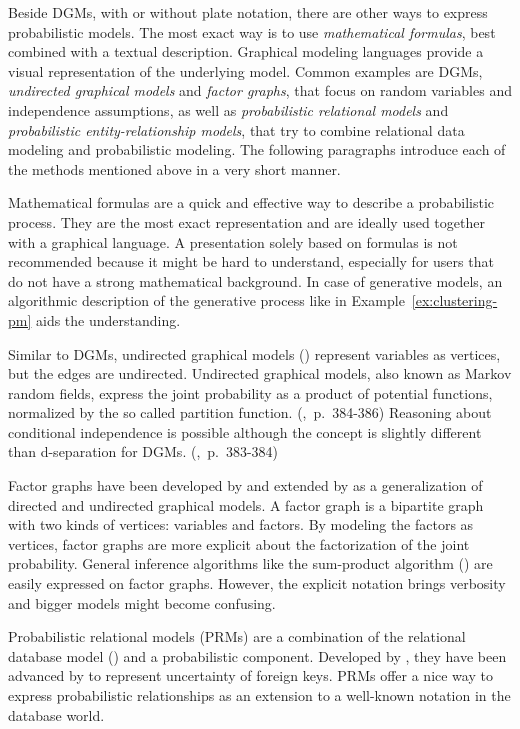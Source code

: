 Beside DGMs, with or without plate notation, there are other ways to express probabilistic models. The most exact way is to use \emph{mathematical formulas}, best combined with a textual description. Graphical modeling languages provide a visual representation of the underlying model. Common examples are DGMs, \emph{undirected graphical models} and \emph{factor graphs}, that focus on random variables and independence assumptions, as well as \emph{probabilistic relational models} and \emph{probabilistic entity-relationship models}, that try to combine relational data modeling and probabilistic modeling. The following paragraphs introduce each of the methods mentioned above in a very short manner.

Mathematical formulas are a quick and effective way to describe a probabilistic process. They are the most exact representation and are ideally used together with a graphical language. A presentation solely based on formulas is not recommended because it might be hard to understand, especially for users that do not have a strong mathematical background. In case of generative models, an algorithmic description of the generative process like in Example~\ref{ex:clustering-pm} aids the understanding. 

Similar to DGMs, undirected graphical models (\cite{kindermann1980markov}) represent variables as vertices, but the edges are undirected. Undirected graphical models, also known as Markov random fields, express the joint probability as a product of potential functions, normalized by the so called partition function. (\cite{bishop2006pattern},~p.~384-386) Reasoning about conditional independence is possible although the concept is slightly different than d-separation for DGMs. (\cite{bishop2006pattern},~p.~383-384)

Factor graphs have been developed by \textcite{kschischang2001factor} and extended by \textcite{frey2002extending} as a generalization of directed and undirected graphical models. A factor graph is a bipartite graph with two kinds of vertices: variables and factors. By modeling the factors as vertices, factor graphs are more explicit about the factorization of the joint probability. General inference algorithms like the sum-product algorithm (\cite{pearl1988probabilistic}) are easily expressed on factor graphs. However, the explicit notation brings verbosity and bigger models might become confusing.

Probabilistic relational models (PRMs) are a combination of the relational database model (\cite{codd1970relational}) and a probabilistic component. Developed by \textcite{friedman1999learning}, they have been advanced by \textcite{getoor2003learning} to represent uncertainty of foreign keys. PRMs offer a nice way to express probabilistic relationships as an extension to a well-known notation in the database world.

